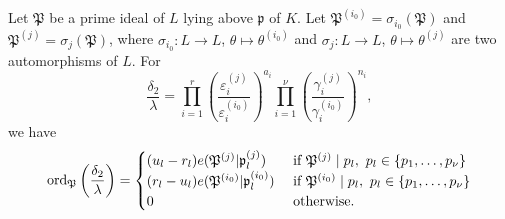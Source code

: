 \begin{lemma}\label{lem:ordpz}
Let $\mathfrak{P}$ be a prime ideal of $L$ lying above $\mathfrak{p}$ of $K$. Let $\mathfrak{P}^{(i_0)} = \sigma_{i_0}(\mathfrak{P})$ and $\mathfrak{P}^{(j)} = \sigma_{j}(\mathfrak{P})$, where $\sigma_{i_0}: L \to L$, $\theta \mapsto \theta^{(i_0)}$ and $\sigma_{j}: L \to L$, $\theta \mapsto \theta^{(j)}$ are two automorphisms of $L$. For 
\[\frac{\delta_2}{\lambda}= \prod_{i = 1}^{r}\left( \frac{\varepsilon_i^{(j)}}{\varepsilon_i^{(i_0)}}\right)^{a_i} \prod_{i = 1}^{\nu} \left( \frac{\gamma_i^{(j)}}{\gamma_i^{(i_0)}}\right)^{n_i},\]
we have
\[\operatorname{ord}_{\mathfrak{P}}\left(\frac{\delta_2}{\lambda}\right)=
\begin{cases}
(u_l - r_l)e(\mathfrak{P}^{(j)}|\mathfrak{p}_l^{(j)})	
	& \textnormal{ if } \mathfrak{P}^{(j)} \mid p_l , \ p_l \in \{p_1,\dots, p_{\nu}\}\\
(r_l - u_l)e(\mathfrak{P}^{(i_0)}|\mathfrak{p}_l^{(i_0)})
	& \textnormal{ if } \mathfrak{P}^{(i_0)}\mid p_l, \ p_l \in \{p_1,\dots, p_{\nu}\}\\
0 	& \textnormal{ otherwise}.
\end{cases}\]
\end{lemma}
